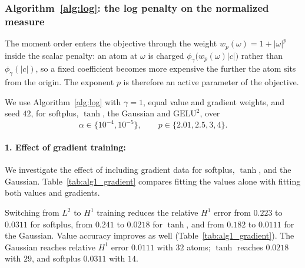 \documentclass[11pt]{amsart}
\theoremstyle{definition}
\theoremstyle{remark}
\begin{document}
\subsubsection*{Algorithm~\ref{alg:log}: the log penalty on the normalized measure}
The moment order enters the objective through the weight
$w_p(\omega)=1+|\omega|^p$ inside the scalar penalty: an atom at
$\omega$ is charged $\phi_\gamma\bigl(w_p(\omega)|c|\bigr)$ rather than
$\phi_\gamma(|c|)$, so a fixed coefficient becomes more expensive the further
the atom sits from the origin. The exponent $p$ is therefore an active
parameter of the objective.

We use Algorithm~\ref{alg:log} with $\gamma=1$, equal value and gradient weights, and seed $42$, for softplus,
$\tanh$, the Gaussian and $\mathrm{GELU}^2$, over
\begin{equation*}
	\alpha\in\{10^{-4},10^{-5}\},
	\qquad
	p\in\{2.01,2.5,3,4\}.
\end{equation*}


\paragraph{\textbf{1. Effect of gradient training:}}
We investigate the effect of including gradient data for softplus, $\tanh$,
and the Gaussian. Table~\ref{tab:alg1_gradient} compares fitting the values
alone with fitting both values and gradients.

Switching from $L^2$ to $H^1$ training reduces the relative $H^1$ error
from $0.223$ to $0.0311$ for softplus, from $0.241$ to $0.0218$ for $\tanh$,
and from $0.182$ to $0.0111$ for the Gaussian. Value accuracy improves as
well (Table~\ref{tab:alg1_gradient}). The Gaussian reaches relative $H^1$
error $0.0111$ with $32$ atoms; $\tanh$ reaches $0.0218$ with $29$, and
softplus $0.0311$ with $14$.
\end{document}
